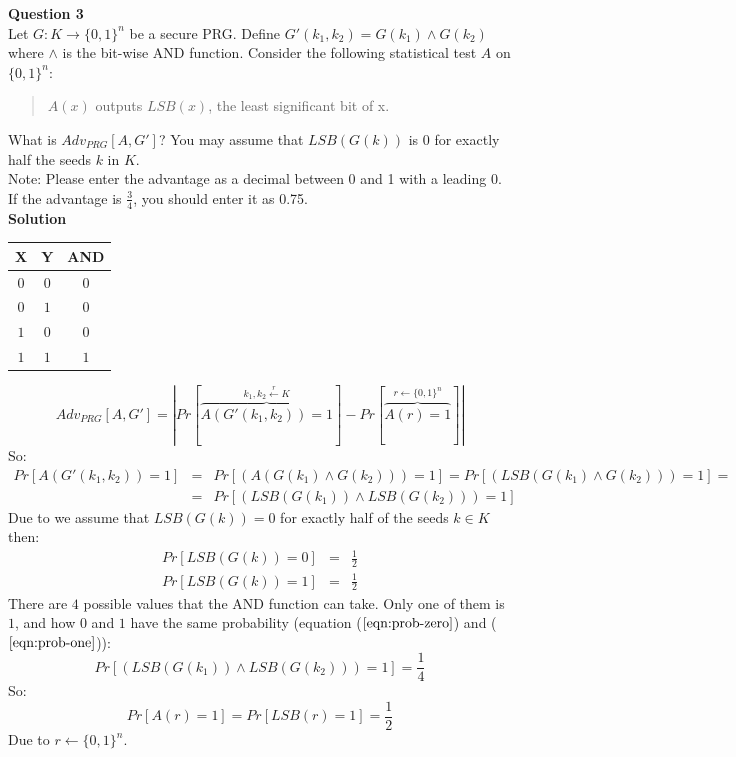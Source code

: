 \documentclass[a4paper,12pt]{article}
\begin{document}
\textbf{Question 3} \\

Let $G:K\rightarrow \{0,1\}^{n}$ be a secure PRG. Define $G'(k_{1},k_{2})=G(k_{1})\wedge G(k_{2})$ where $\wedge$ is the bit-wise AND function. Consider the following statistical test $A$ on $\{0,1\}^{n}$:
%
\begin{quote}
$A(x)$ outputs $LSB(x)$, the least significant bit of x.   
\end{quote}
%
What is $Adv_{PRG}[A,G']$? You may assume that $LSB(G(k))$ is 0 for exactly half the seeds $k$ in $K$.\\ 

Note: Please enter the advantage as a decimal between 0 and 1 with a leading 0. If the advantage is $\frac{3}{4}$, you should enter it as 0.75.\\

\textbf{Solution} \\

\begin{center}
%
\begin{tabular}{c|c|c}
X & Y & AND \\
\hline
 $0$ & $0$ & $0$ \\
 $0$ & $1$ & $0$\\
 $1$ & $0$ & $0$\\
 $1$ & $1$ & $1$ 
\end{tabular}
%
\end{center}

\begin{equation*}
Adv_{PRG}[A,G'] = |Pr[\overbrace{A(G'(k_{1},k_{2}))=1}^{k_{1},k_{2} \xleftarrow{r} K}] - Pr[\overbrace{A(r)=1}^{r \leftarrow \{0,1\}^{n}}]|
\end{equation*}
%
So:
%
\begin{eqnarray*}
Pr[A(G'(k_{1},k_{2}))=1] & = & Pr[(A(G(k_{1})\wedge G(k_{2})))=1] = Pr[(LSB(G(k_{1})\wedge G(k_{2})))=1] = \\
 & = & Pr[(LSB(G(k_{1}))\wedge LSB(G(k_{2})))=1]
\end{eqnarray*}
%
Due to we assume that $LSB(G(k)) = 0$ for exactly half of the seeds $k \in K$ then:
%
\begin{eqnarray}
Pr[LSB(G(k))=0] & = & \frac{1}{2} \label{eqn:prob-zero} \\
Pr[LSB(G(k))=1] & = & \frac{1}{2}  \label{eqn:prob-one}
\end{eqnarray}
%
There are $4$ possible values that the AND function can take. Only one of them is $1$, and how $0$ and $1$ have the same probability (equation ($\ref{eqn:prob-zero}$) and ($\ref{eqn:prob-one}$)):
%
\begin{equation*}
Pr[(LSB(G(k_{1}))\wedge LSB(G(k_{2})))=1] = \frac{1}{4}  
\end{equation*}
%
So:
%
\begin{equation*}
Pr[A(r)=1] = Pr[LSB(r)=1] = \frac{1}{2}  
\end{equation*}
%
Due to $r\leftarrow \{0,1\}^{n}$.
\end{document}
